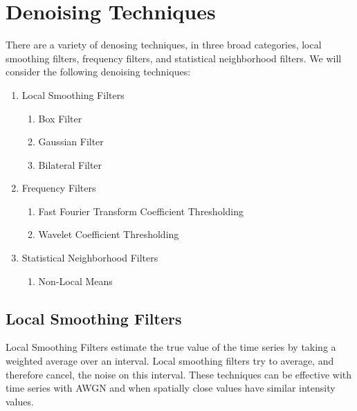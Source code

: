 \documentclass[11pt]{article}
\theoremstyle{definition}
\begin{document}
\section{Denoising Techniques}


There are a variety of denosing techniques, in three broad categories, local smoothing filters, frequency filters, and statistical neighborhood filters. We will consider the following denoising techniques:

\begin{enumerate}[2.1]

\item Local Smoothing Filters

\begin{enumerate}

\item Box Filter

\item Gaussian Filter

\item Bilateral Filter

\end{enumerate}

\item Frequency Filters

\begin{enumerate}

\item Fast Fourier Transform Coefficient Thresholding

\item Wavelet Coefficient Thresholding

\end{enumerate}

\item Statistical Neighborhood Filters

\begin{enumerate}

\item Non-Local Means

\end{enumerate}

\end{enumerate}


\subsection{Local Smoothing Filters}

Local Smoothing Filters estimate the true value of the time series by taking a weighted average over an interval. Local smoothing filters try to average, and therefore cancel, the noise on this interval. These techniques can be effective with time series with AWGN and when spatially close values have similar intensity values.\\
\end{document}
